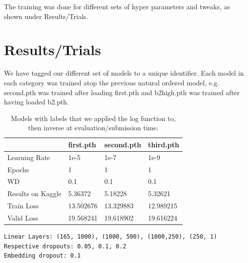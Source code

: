 \documentclass[10pt,twocolumn,letterpaper]{article}
\begin{document}
  The training was done for different sets of hyper parameters and tweaks, as
  shown under Results/Trials.


\section{Results/Trials}
  We have tagged our different set of models to a unique identifier. Each model
  in each category was trained atop the previous natural ordered model, e.g.
  second.pth was trained after loading first.pth and b2high.pth was trained
  after having loaded b2.pth.

\begin{table}[]
  \begin{center}
    \tabcolsep=0.11cm
    \begin{tabular}{|l|l|l|l|}
    \hline
                      & first.pth & second.pth & third.pth \\ \hline
    Learning Rate     & 1e-5      & 1e-7       & 1e-9      \\ \hline
    Epochs            & 1         & 1          & 1         \\ \hline
    WD                & 0.1       & 0.1        & 0.1       \\ \hline
    Results on Kaggle & 5.36372   & 5.18228    & 5.32621   \\ \hline
    Train Loss        & 13.502676 & 13.329883  & 12.989215 \\ \hline
    Valid Loss        & 19.568241 & 19.618902  & 19.616224 \\ \hline
    \end{tabular}
    {\scriptsize
    \begin{verbatim}
Linear Layers: (165, 1000), (1000, 500), (1000,250), (250, 1)
Respective dropouts: 0.05, 0.1, 0.2
Embedding dropout: 0.1
    \end{verbatim}}
  \end{center}
  \caption{Models with labels that we applied the log function to, then inverse
  at evaluation/submission time.}
\end{table}
\end{document}
